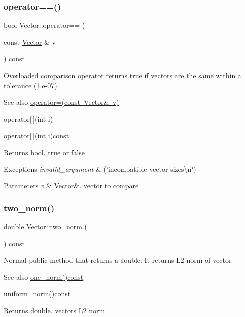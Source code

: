 \subsubsection{\texorpdfstring{operator==()}{operator==()}}
{\footnotesize\ttfamily bool Vector\+::operator== (\begin{DoxyParamCaption}\item[{const \mbox{\hyperlink{class_vector}{Vector}} \&}]{v }\end{DoxyParamCaption}) const}

Overloaded comparison operator returns true if vectors are the same within a tolerance (1.\+e-\/07) \begin{DoxySeeAlso}{See also}
\mbox{\hyperlink{class_vector_ae48c467a9f65d60e2f7455aba4ca1239}{operator=(const Vector\& v)}} 

operator\mbox{[}$\,$\mbox{]}(int i) 

operator\mbox{[}$\,$\mbox{]}(int i)const 
\end{DoxySeeAlso}
\begin{DoxyReturn}{Returns}
bool. true or false 
\end{DoxyReturn}

\begin{DoxyExceptions}{Exceptions}
{\em invalid\+\_\+argument} & (\char`\"{}incompatible vector sizes\textbackslash{}n\char`\"{}) \\
\hline
\end{DoxyExceptions}

\begin{DoxyParams}{Parameters}
{\em v} & \mbox{\hyperlink{class_vector}{Vector}}\&. vector to compare \\
\hline
\end{DoxyParams}
\mbox{\label{class_vector_a4f501290a50d057bb6c57ea64d7e70a4}} 
\subsubsection{\texorpdfstring{two\+\_\+norm()}{two\_norm()}}
{\footnotesize\ttfamily double Vector\+::two\+\_\+norm (\begin{DoxyParamCaption}{ }\end{DoxyParamCaption}) const}

Normal public method that returns a double. It returns L2 norm of vector \begin{DoxySeeAlso}{See also}
\mbox{\hyperlink{class_vector_a6752a90058ddef427ca6aed12946a737}{one\+\_\+norm()const}} 

\mbox{\hyperlink{class_vector_a50b72131eaf3698a9876d99ab6912a32}{uniform\+\_\+norm()const}} 
\end{DoxySeeAlso}
\begin{DoxyReturn}{Returns}
double. vectors L2 norm 
\end{DoxyReturn}
\mbox{\label{class_vector_a50b72131eaf3698a9876d99ab6912a32}} 
